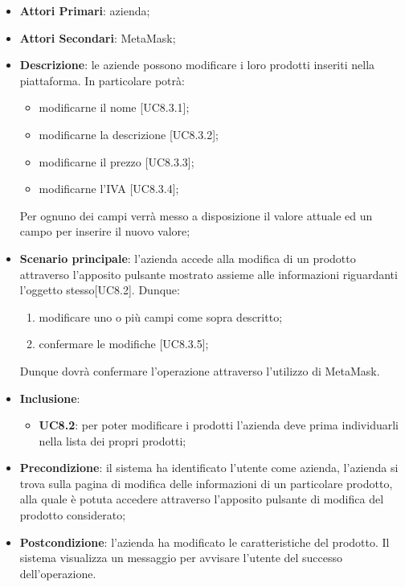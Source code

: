 \begin{itemize}
	\item \textbf{Attori Primari}: azienda;
	\item \textbf{Attori Secondari}: MetaMask\glo;
	\item \textbf{Descrizione}: le aziende possono modificare i loro prodotti inseriti nella piattaforma. In particolare potrà:
	 \begin{itemize}
		\item modificarne il nome [UC8.3.1];
		\item modificarne la descrizione [UC8.3.2];
		\item modificarne il prezzo [UC8.3.3];
		\item modificarne l'IVA [UC8.3.4];
		
	\end{itemize}
	Per ognuno dei campi verrà messo a disposizione il valore attuale ed un campo per inserire il nuovo valore;

	\item \textbf{Scenario principale}: l'azienda accede alla modifica di un prodotto attraverso l'apposito pulsante mostrato assieme alle informazioni riguardanti l'oggetto stesso[UC8.2]. Dunque: 
	\begin{enumerate}[label=\alph*.]
		\item modificare uno o più campi come sopra descritto;
		\item confermare le modifiche [UC8.3.5];
	\end{enumerate}
	Dunque dovrà confermare l'operazione attraverso l'utilizzo di MetaMask\glo.
	\item \textbf{Inclusione}:
	\begin{itemize}
		\item \textbf{UC8.2}: per poter modificare i prodotti l'azienda deve prima individuarli nella lista dei propri prodotti;
	\end{itemize}
	\item \textbf{Precondizione}: il sistema ha identificato l'utente come azienda, l'azienda si trova sulla pagina di modifica delle informazioni di un particolare prodotto, alla quale è potuta accedere attraverso l'apposito pulsante di modifica del prodotto considerato;
	\item \textbf{Postcondizione}: l'azienda ha modificato le caratteristiche del prodotto. Il sistema visualizza un messaggio per avvisare l'utente del successo dell'operazione.
\end{itemize}

